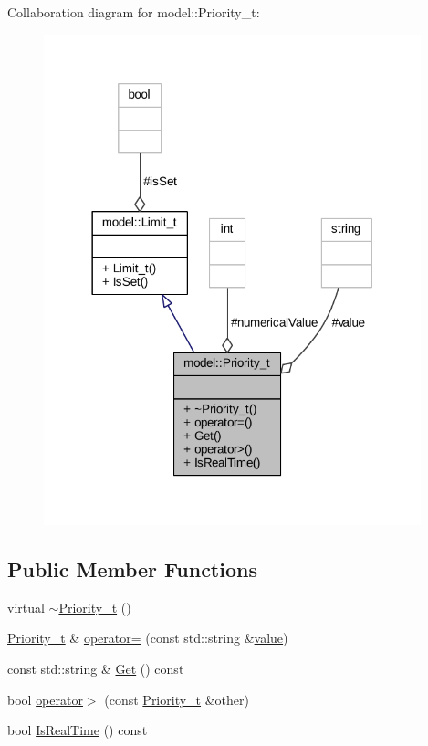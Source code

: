 Collaboration diagram for model\+:\+:Priority\+\_\+t\+:
\nopagebreak
\begin{figure}[H]
\begin{center}
\leavevmode
\includegraphics[width=310pt]{classmodel_1_1_priority__t__coll__graph}
\end{center}
\end{figure}
\subsection*{Public Member Functions}
\begin{DoxyCompactItemize}
\item 
virtual \hyperlink{classmodel_1_1_priority__t_a17fc9673c6f4ac2db083f0c550fc199e}{$\sim$\+Priority\+\_\+t} ()
\item 
\hyperlink{classmodel_1_1_priority__t}{Priority\+\_\+t} \& \hyperlink{classmodel_1_1_priority__t_adcebfb30553ee5b5692bd115e4bbc862}{operator=} (const std\+::string \&\hyperlink{classmodel_1_1_priority__t_ae8093c08ba694dd16cd3b64c1d9610c9}{value})
\item 
const std\+::string \& \hyperlink{classmodel_1_1_priority__t_a576954967eb4a28486440e6694c7394f}{Get} () const 
\item 
bool \hyperlink{classmodel_1_1_priority__t_ad72d13a67db435421a0dcc05a1592572}{operator$>$} (const \hyperlink{classmodel_1_1_priority__t}{Priority\+\_\+t} \&other)
\item 
bool \hyperlink{classmodel_1_1_priority__t_a66fd2216c76b2eaec57f04b48d8b9f70}{Is\+Real\+Time} () const 
\end{DoxyCompactItemize}
